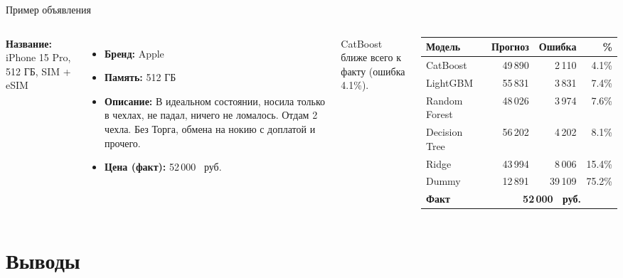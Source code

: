\documentclass[aspectratio=169,12pt]{beamer}
\newcommand{\rub}{~руб.}
\begin{document}
\begin{frame}{Пример объявления}
  \footnotesize
  \begin{columns}[T]
    \textbf{Название:} iPhone 15 Pro, 512 ГБ, SIM + eSIM

    \vspace{0.4em}
    \begin{itemize}
      \item \textbf{Бренд:} Apple
      \item \textbf{Память:} 512 ГБ
      \item \textbf{Описание:} В идеальном состоянии, носила только в чехлах, не падал, ничего не ломалось. Отдам 2 чехла.
Без Торга, обмена на нокию с доплатой и прочего.
      \item \textbf{Цена (факт):} 52\,000 \rub
    \end{itemize}

    \vspace{0.3em}
    \scriptsize
    CatBoost ближе всего к факту (ошибка 4.1\%).

    \centering
    \begin{tabular}{@{}lrrr@{}}
      \toprule
      \textbf{Модель} & \textbf{Прогноз} & \textbf{Ошибка} & \textbf{\%} \\
      \midrule
      CatBoost & 49\,890 & 2\,110 & 4.1\% \\
      LightGBM & 55\,831 & 3\,831 & 7.4\% \\
      Random Forest & 48\,026 & 3\,974 & 7.6\% \\
      Decision Tree & 56\,202 & 4\,202 & 8.1\% \\
      Ridge & 43\,994 & 8\,006 & 15.4\% \\
      Dummy & 12\,891 & 39\,109 & 75.2\% \\
      \midrule
      \textbf{Факт} & \multicolumn{3}{c}{\textbf{52\,000 \rub}} \\
      \bottomrule
    \end{tabular}
  \end{columns}
\end{frame}

\section{Выводы}
\end{document}
